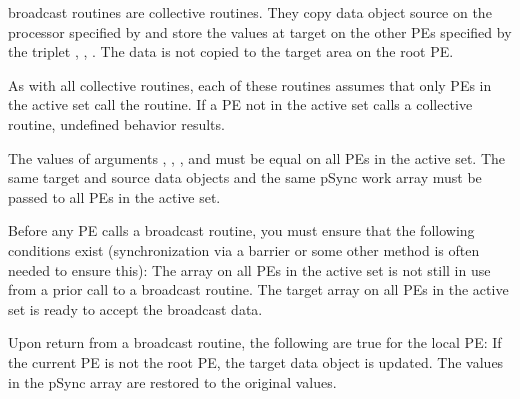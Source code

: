 {   
\OSH{} broadcast routines are collective routines.
They copy data object source on the processor specified by  and
store the values at target on the other \ac{PE}s specified by the triplet
, , . The data is not copied to the target
area on the root \ac{PE}.

As with all \OSH{} collective routines, each of these routines assumes
that only \ac{PE}s in the active set call the routine. If a \ac{PE} not in the
active set calls a \OSH{} collective routine, undefined behavior
results.

The values of arguments , , , and 
must be equal on all \ac{PE}s in the active set. The same target and source
data objects and the same pSync work array must be passed to all \ac{PE}s in
the active set.

Before any \ac{PE} calls a broadcast	routine, you must ensure that the
following conditions exist (synchronization via a barrier or some other
method is often needed to ensure this): The  array on all \ac{PE}s in
the active set is not still in use from a prior call to a broadcast
routine. The target array on all \ac{PE}s in the active set is ready to
accept the broadcast data.

Upon return from a broadcast routine, the following are true for the
local \ac{PE}: If the current \ac{PE} is not the root \ac{PE}, the target data	object
is updated. The values in the pSync array are restored to the original
values.
}
